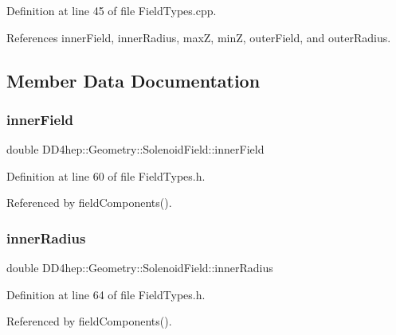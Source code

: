 Definition at line 45 of file Field\+Types.\+cpp.



References inner\+Field, inner\+Radius, maxZ, minZ, outer\+Field, and outer\+Radius.



\subsection{Member Data Documentation}
\hypertarget{class_d_d4hep_1_1_geometry_1_1_solenoid_field_a4f18728f3a52760c259432d4c2c6d2af}{}\label{class_d_d4hep_1_1_geometry_1_1_solenoid_field_a4f18728f3a52760c259432d4c2c6d2af} 
\subsubsection{\texorpdfstring{inner\+Field}{innerField}}
{\footnotesize\ttfamily double D\+D4hep\+::\+Geometry\+::\+Solenoid\+Field\+::inner\+Field}



Definition at line 60 of file Field\+Types.\+h.



Referenced by field\+Components().

\hypertarget{class_d_d4hep_1_1_geometry_1_1_solenoid_field_a76e7d98a12bae50393178361083ef37e}{}\label{class_d_d4hep_1_1_geometry_1_1_solenoid_field_a76e7d98a12bae50393178361083ef37e} 
\subsubsection{\texorpdfstring{inner\+Radius}{innerRadius}}
{\footnotesize\ttfamily double D\+D4hep\+::\+Geometry\+::\+Solenoid\+Field\+::inner\+Radius}



Definition at line 64 of file Field\+Types.\+h.



Referenced by field\+Components().

\hypertarget{class_d_d4hep_1_1_geometry_1_1_solenoid_field_aa38b5bc9144edd3b19a837c8c2473e96}{}\label{class_d_d4hep_1_1_geometry_1_1_solenoid_field_aa38b5bc9144edd3b19a837c8c2473e96} 
